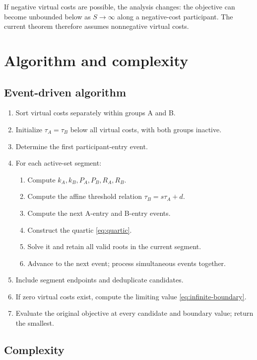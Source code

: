 \documentclass[11pt,a4paper]{article}
\newcommand{\1}{\mathbf{1}}
\begin{document}
If negative virtual costs are possible, the analysis changes: the
objective can become unbounded below as \(S\to\infty\) along a
negative-cost participant. The current theorem therefore assumes
nonnegative virtual costs.

\section{Algorithm and complexity}

\subsection{Event-driven algorithm}

\begin{enumerate}
  \item Sort virtual costs separately within groups A and B.
  \item Initialize \(\tau_A=\tau_B\) below all virtual costs, with both
        groups inactive.
  \item Determine the first participant-entry event.
  \item For each active-set segment:
  \begin{enumerate}
    \item Compute \(k_A,k_B,P_A,P_B,R_A,R_B\).
    \item Compute the affine threshold relation
          \(\tau_B=s\tau_A+d\).
    \item Compute the next A-entry and B-entry events.
    \item Construct the quartic \eqref{eq:quartic}.
    \item Solve it and retain all valid roots in the current segment.
    \item Advance to the next event; process simultaneous events together.
  \end{enumerate}
  \item Include segment endpoints and deduplicate candidates.
  \item If zero virtual costs exist, compute the limiting value
        \eqref{eq:infinite-boundary}.
  \item Evaluate the original objective at every candidate and boundary
        value; return the smallest.
\end{enumerate}

\subsection{Complexity}
\end{document}
